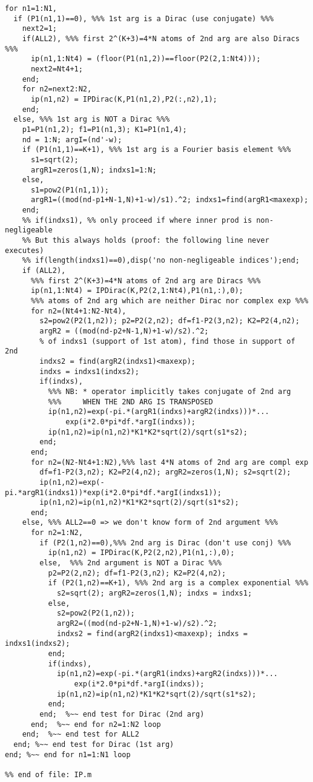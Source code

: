 \begin{small}
\begin{verbatim}
for n1=1:N1,
  if (P1(n1,1)==0), %%% 1st arg is a Dirac (use conjugate) %%%
    next2=1;
    if(ALL2), %%% first 2^(K+3)=4*N atoms of 2nd arg are also Diracs %%%
      ip(n1,1:Nt4) = (floor(P1(n1,2))==floor(P2(2,1:Nt4)));
      next2=Nt4+1;
    end;
    for n2=next2:N2,
      ip(n1,n2) = IPDirac(K,P1(n1,2),P2(:,n2),1);
    end;
  else, %%% 1st arg is NOT a Dirac %%%
    p1=P1(n1,2); f1=P1(n1,3); K1=P1(n1,4);
    nd = 1:N; argI=(nd'-w);
    if (P1(n1,1)==K+1), %%% 1st arg is a Fourier basis element %%%
      s1=sqrt(2); 
      argR1=zeros(1,N); indxs1=1:N;
    else,
      s1=pow2(P1(n1,1)); 
      argR1=((mod(nd-p1+N-1,N)+1-w)/s1).^2; indxs1=find(argR1<maxexp);
    end;
    %% if(indxs1), %% only proceed if where inner prod is non-negligeable
    %% But this always holds (proof: the following line never executes)
    %% if(length(indxs1)==0),disp('no non-negligeable indices');end;
    if (ALL2), 
      %%% first 2^(K+3)=4*N atoms of 2nd arg are Diracs %%%
      ip(n1,1:Nt4) = IPDirac(K,P2(2,1:Nt4),P1(n1,:),0);
      %%% atoms of 2nd arg which are neither Dirac nor complex exp %%%
      for n2=(Nt4+1:N2-Nt4),
        s2=pow2(P2(1,n2)); p2=P2(2,n2); df=f1-P2(3,n2); K2=P2(4,n2);
        argR2 = ((mod(nd-p2+N-1,N)+1-w)/s2).^2;
        % of indxs1 (support of 1st atom), find those in support of 2nd
        indxs2 = find(argR2(indxs1)<maxexp);
        indxs = indxs1(indxs2);
        if(indxs),
          %%% NB: * operator implicitly takes conjugate of 2nd arg
          %%%     WHEN THE 2ND ARG IS TRANSPOSED
          ip(n1,n2)=exp(-pi.*(argR1(indxs)+argR2(indxs)))*...
              exp(i*2.0*pi*df.*argI(indxs));
          ip(n1,n2)=ip(n1,n2)*K1*K2*sqrt(2)/sqrt(s1*s2);
        end;
      end;
      for n2=(N2-Nt4+1:N2),%%% last 4*N atoms of 2nd arg are compl exp
        df=f1-P2(3,n2); K2=P2(4,n2); argR2=zeros(1,N); s2=sqrt(2);
        ip(n1,n2)=exp(-pi.*argR1(indxs1))*exp(i*2.0*pi*df.*argI(indxs1));
        ip(n1,n2)=ip(n1,n2)*K1*K2*sqrt(2)/sqrt(s1*s2);
      end;
    else, %%% ALL2==0 => we don't know form of 2nd argument %%%
      for n2=1:N2,
        if (P2(1,n2)==0),%%% 2nd arg is Dirac (don't use conj) %%%
          ip(n1,n2) = IPDirac(K,P2(2,n2),P1(n1,:),0);
        else,  %%% 2nd argument is NOT a Dirac %%%
          p2=P2(2,n2); df=f1-P2(3,n2); K2=P2(4,n2);
          if (P2(1,n2)==K+1), %%% 2nd arg is a complex exponential %%%
            s2=sqrt(2); argR2=zeros(1,N); indxs = indxs1;
          else,
            s2=pow2(P2(1,n2)); 
            argR2=((mod(nd-p2+N-1,N)+1-w)/s2).^2;
            indxs2 = find(argR2(indxs1)<maxexp); indxs = indxs1(indxs2);
          end;
          if(indxs),
            ip(n1,n2)=exp(-pi.*(argR1(indxs)+argR2(indxs)))*...
                exp(i*2.0*pi*df.*argI(indxs));
            ip(n1,n2)=ip(n1,n2)*K1*K2*sqrt(2)/sqrt(s1*s2);
          end;
        end;  %~~ end test for Dirac (2nd arg)
      end;  %~~ end for n2=1:N2 loop
    end;  %~~ end test for ALL2 
  end; %~~ end test for Dirac (1st arg)
end; %~~ end for n1=1:N1 loop

%% end of file: IP.m
\end{verbatim}   \end{small}

